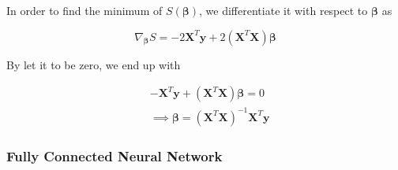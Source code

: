  In order to find the minimum of $S(\boldsymbol{\beta})$, we differentiate it with respect to $\boldsymbol{\beta}$ as 
 
 \begin{equation}
 	\nabla_{\boldsymbol{\beta}}S=-2\boldsymbol{X}^T\boldsymbol{y}+2(\boldsymbol{X}^T\boldsymbol{X})\boldsymbol{\beta}
 \end{equation}
 
 By let it to be zero, we end up with 
 
 \begin{equation}
 \begin{split}
 	 &	-\boldsymbol{X}^T\boldsymbol{y}+(\boldsymbol{X}^T\boldsymbol{X})\boldsymbol{\beta}=0 \\
 	& \implies \boldsymbol{\beta}= (\boldsymbol{X}^T\boldsymbol{X})^{-1}\boldsymbol{X}^T\boldsymbol{y}
 \end{split}
 \end{equation}
 
\subsubsection{Fully Connected Neural Network}